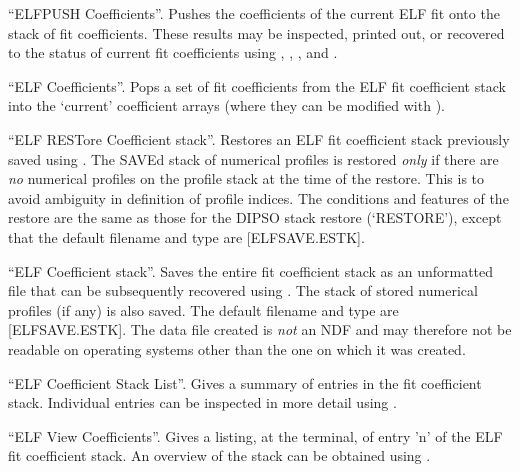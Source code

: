 \begin {description}
``ELFPUSH Coefficients''. Pushes the coefficients of the current ELF
fit onto the stack of fit coefficients. These results may be
inspected, printed out, or recovered to the status of current fit
coefficients using ,  ,  ,  and . 

``ELF   Coefficients''. Pops a set of fit coefficients from the ELF
fit coefficient stack into the `current' coefficient arrays (where
they can be modified with ). 

``ELF RESTore Coefficient stack''. Restores an ELF fit coefficient
stack previously saved using .  The SAVEd stack of numerical
profiles is restored {\em only} if there are {\em no} numerical
profiles on the profile stack at the time of the restore. This is to
avoid ambiguity in definition of profile indices. The conditions and
features of the restore are the same as those for the DIPSO stack
restore (`RESTORE'), except that the default filename and type are
[ELFSAVE.ESTK].

``ELF   Coefficient stack''. Saves the entire fit coefficient stack
as an unformatted file that can be subsequently recovered using
.  The stack of stored numerical profiles (if any) is also
saved. The default filename and type are [ELFSAVE.ESTK]. The data file
created is {\em not} an NDF and may therefore not be readable on operating
systems other than the one on which it was created.

``ELF Coefficient Stack List''. Gives a summary of entries in the fit
coefficient stack. Individual entries can be inspected in more detail
using . 

``ELF View Coefficients''. Gives a listing, at the terminal, of entry
'n' of the ELF fit coefficient stack. An overview of the stack can be
obtained using . 


\end{description}
